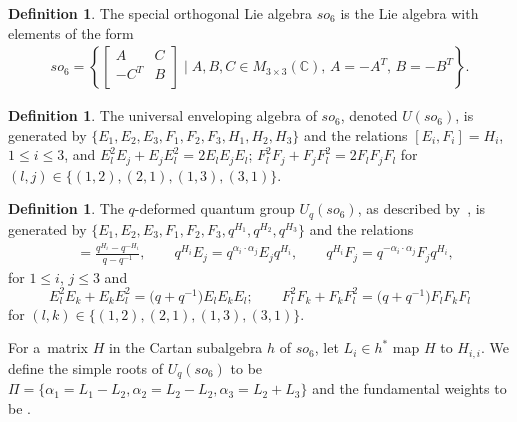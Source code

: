 \documentclass[10pt,a4paper]{amsart}
\numberwithin{equation}{section}
\theoremstyle{definition}
\newtheorem{Definition}[Theorem]{Definition}
\def\mathcal#1{#1}
\def\mathfrak#1{#1}
\def\mathsf#1{#1}
\begin{document}
\begin{Definition}
 The special orthogonal Lie algebra $\mathfrak{so}_{6}$ is the Lie algebra with elements of the form
 \begin{align*}
 \mathfrak{so}_{6} = \left\{\begin{bmatrix}
 A & C \\
 -C^{\mathsf{T}} & B \\
 \end{bmatrix}\mid A,B,C \in M_{3 \times 3} (\mathbb{C}),\, A = - A^{\mathsf{T}},\, B=-B^{\mathsf{T}}\right\}.
 \end{align*}
\end{Definition}


\begin{Definition}
 The universal enveloping algebra of $\mathfrak{so}_6$, denoted $\mathcal{U}(\mathfrak{so}_6)$, is generated by
 $\{E_1, E_2, E_3, F_1, F_2, F_3, H_1, H_2, H_3\}$ and the relations $[E_i, F_i] = H_i$, $1 \leq i \leq 3$, and $ E_l^2E_j + E_jE_l^2 = 2E_lE_jE_l$; $ F_l^2F_j + F_jF_l^2 = 2F_lF_jF_l$
 for $(l,j) \in \{ (1,2), (2,1), (1,3), (3,1) \}$.
\end{Definition}

\begin{Definition}
 The $q$-deformed quantum group $\mathcal{U}_q(\mathfrak{so}_6)$, as described by~\cite{Drinfeld85,Jimbo85}, is generated by $\bigl\{E_1, E_2, E_3, F_1, F_2, F_3, q^{H_1}, q^{H_2}, q^{H_3}\bigr\}$ and the relations
 \begin{align*}
 [E_i, F_i] &= \frac{q^{H_i} - q^{-H_i}}{q-q^{-1}}, \qquad
 q^{H_i}E_j = q^{\alpha_i \cdot \alpha_j}E_j q^{H_i}, \qquad
 q^{H_i}F_j = q^{-\alpha_i \cdot \alpha_j}F_j q^{H_i},
 \end{align*}
 for $ 1 \leq i$, $j \leq 3$ and
  \[
  E_l^2E_k + E_kE_l^2 = \bigl(q+q^{-1}\bigr)E_lE_kE_l; \qquad  F_l^2F_k + F_kF_l^2 = \bigl(q+q^{-1}\bigr)F_lF_kF_l
   \]
   for $(l,k) \in \{ (1,2), (2,1), (1,3), (3,1) \}$.

 For a~matrix $H$ in the Cartan subalgebra $\mathfrak{h}$ of $\mathfrak{so}_6$, let $L_i \in \mathfrak{h}^*$ map $H$ to $H_{i,i}$. We define the simple roots of $\mathcal{U}_q(\mathfrak{so}_6)$ to be $\Pi = \{\alpha_1 = L_1 - L_2, \alpha_2 = L_2 - L_2, \alpha_3 = L_2 + L_3\} $
 and the fundamental weights to be .
\end{Definition}
\end{document}
